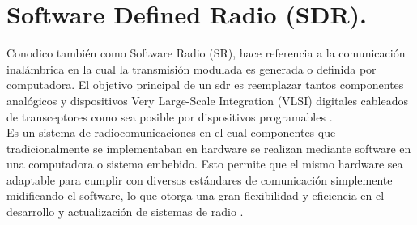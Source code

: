 \section*{\fontsize{12}{18}\selectfont Software Defined Radio (SDR).}

\begin{justify}
    Conodico también como Software Radio (SR), hace referencia a la comunicación inalámbrica en la cual
    la transmisión modulada es generada o definida por computadora. El objetivo principal de un \gls{sdr}
    es reemplazar tantos componentes analógicos y dispositivos Very Large-Scale Integration (VLSI) digitales
    cableados de transceptores como sea posible por dispositivos programables \parencite{sadiku2004software}.\\

    Es un sistema de radiocomunicaciones en el cual componentes que tradicionalmente se implementaban
    en hardware se realizan mediante software en una computadora o sistema embebido. Esto permite que el mismo
    hardware sea adaptable para cumplir con diversos estándares de comunicación simplemente midificando el software,
    lo que otorga una gran flexibilidad y eficiencia en el desarrollo y actualización de sistemas de radio \parencite{gnuradio}.
\end{justify}